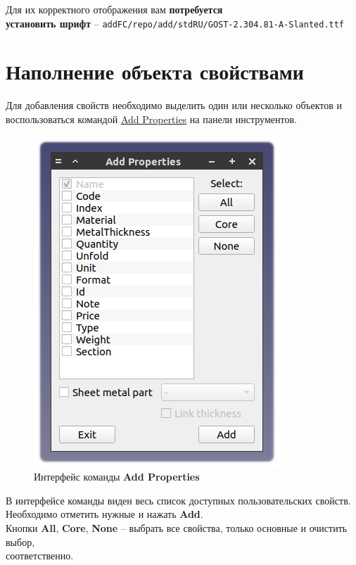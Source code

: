\documentclass[a4paper,12pt]{article}
\begin{document}
Для их корректного отображения вам \textbf{потребуется\\установить шрифт} -- \verb|addFC/repo/add/stdRU/GOST-2.304.81-A-Slanted.ttf|\\

\pagebreak




\section{Наполнение объекта свойствами}

Для добавления свойств необходимо выделить один или несколько объектов и воспользоваться командой \hyperref[sec:5]{Add Properties} на панели инструментов.

\begin{figure}[htp]
	\centering
	\includegraphics[scale=1]{img/properties_add.png}
	\caption{Интерфейс команды \textbf{Add Properties}}
	\label{sec:properties_add}
\end{figure}

В интерфейсе команды виден весь список доступных пользовательских свойств. Необходимо отметить нужные и нажать \textbf{Add}.\\

Кнопки \textbf{All}, \textbf{Core}, \textbf{None} -- выбрать все свойства, только основные и очистить выбор,\\соответственно.\\
\end{document}
